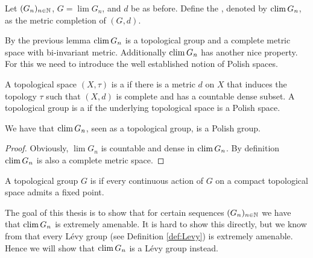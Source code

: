 \begin{definition}
Let $(G_n)_{n\in\mathbb{N}}$, $G=\lim G_n$, and $d$ be as before. Define the , denoted by $\operatorname{clim} G_n$, as the metric completion of $(G,d)$.
\end{definition}
By the previous lemma $\operatorname{clim} G_n$ is a topological group and a complete metric space with bi-invariant metric. 
Additionally $\operatorname{clim} G_n$ has another nice property. For this we need to introduce the well established notion of Polish spaces. 
\begin{definition}
A topological space $(X,\tau)$ is a  if there is a metric $d$ on $X$ that induces the topology $\tau$ such that $(X,d)$ is complete and has a countable dense subset. A topological group is a  if the underlying topological space is a Polish space.
\end{definition}

\begin{lemma}\label{lem:climIsPolish}
We have that $\operatorname{clim} G_n$, seen as a topological group, is a Polish group.
\end{lemma}
\begin{proof}
Obviously, $\lim G_n$ is countable and dense in $\operatorname{clim} G_n$. By definition $\operatorname{clim} G_n$ is also a complete metric space.
\end{proof}

\begin{definition}
A topological group $G$ is  if every continuous action of $G$ on a compact topological space admits a fixed point.
\end{definition}

The goal of this thesis is to show that for certain sequences $(G_n)_{n\in\mathbb{N}}$ we have that $\operatorname{clim} G_n$ is extremely amenable. It is hard to show this directly, but we know from \cite{Levy} that every L\'evy group (see Definition \ref{def:Levy}) is extremely amenable. Hence we will show that $\operatorname{clim} G_n$ is a L\'evy group instead.




